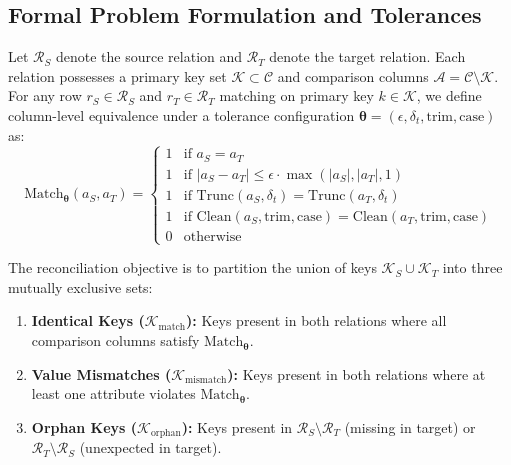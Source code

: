 \documentclass[10pt,journal,compsoc]{IEEEtran}
\begin{document}
\subsection{Formal Problem Formulation and Tolerances}
Let $\mathcal{R}_S$ denote the source relation and $\mathcal{R}_T$ denote the target relation. Each relation possesses a primary key set $\mathcal{K} \subset \mathcal{C}$ and comparison columns $\mathcal{A} = \mathcal{C} \setminus \mathcal{K}$.
For any row $r_S \in \mathcal{R}_S$ and $r_T \in \mathcal{R}_T$ matching on primary key $k \in \mathcal{K}$, we define column-level equivalence under a tolerance configuration $\boldsymbol{\theta} = (\epsilon, \delta_t, \text{trim}, \text{case})$ as:
\begin{equation}
\text{Match}_{\boldsymbol{\theta}}(a_S, a_T) = \begin{cases}
1 & \text{if } a_S = a_T \\
1 & \text{if } |a_S - a_T| \le \epsilon \cdot \max(|a_S|, |a_T|, 1) \\
1 & \text{if } \text{Trunc}(a_S, \delta_t) = \text{Trunc}(a_T, \delta_t) \\
1 & \text{if } \text{Clean}(a_S, \text{trim}, \text{case}) = \text{Clean}(a_T, \text{trim}, \text{case}) \\
0 & \text{otherwise}
\end{cases}
\end{equation}

The reconciliation objective is to partition the union of keys $\mathcal{K}_S \cup \mathcal{K}_T$ into three mutually exclusive sets:
\begin{enumerate}
    \item \textbf{Identical Keys ($\mathcal{K}_{\text{match}}$):} Keys present in both relations where all comparison columns satisfy $\text{Match}_{\boldsymbol{\theta}}$.
    \item \textbf{Value Mismatches ($\mathcal{K}_{\text{mismatch}}$):} Keys present in both relations where at least one attribute violates $\text{Match}_{\boldsymbol{\theta}}$.
    \item \textbf{Orphan Keys ($\mathcal{K}_{\text{orphan}}$):} Keys present in $\mathcal{R}_S \setminus \mathcal{R}_T$ (missing in target) or $\mathcal{R}_T \setminus \mathcal{R}_S$ (unexpected in target).
\end{enumerate}
\end{document}
